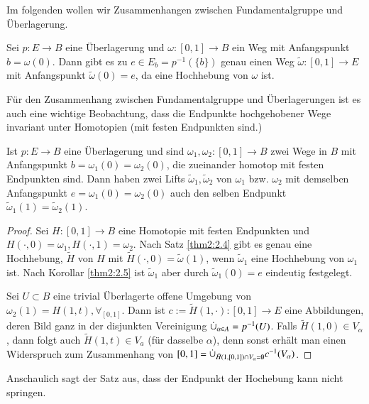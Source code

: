 \documentclass[a4paper,10pt]{scrartcl}
\begin{document}
Im folgenden wollen wir Zusammenhangen zwischen Fundamentalgruppe und Überlagerung.
\begin{kor} \label{thm2:2.5}
 Sei $p:E\to B$ eine Überlagerung und $\omega:[0,1]\to B$ ein Weg mit Anfangspunkt $b=\omega(0)$. Dann gibt es zu $e\in E_b=p^{-1}(\{b\})$ genau einen Weg $\tilde \omega: [0,1] \to E$ mit Anfangspunkt $\tilde \omega(0)=e$, da eine Hochhebung von $\omega$ ist.
\end{kor}
Für den Zusammenhang zwischen Fundamentalgruppe und Überlagerungen ist es auch eine wichtige Beobachtung, dass die Endpunkte hochgehobener Wege invariant unter Homotopien (mit festen Endpunkten sind.) 
\begin{kor}
 Ist $p: E\to B$ eine Überlagerung und sind $ \omega_1, \omega_2: [0,1]\to B$ zwei Wege in $B$ mit Anfangspunkt $b=\omega_1(0)=\omega_2(0)$, 
die zueinander homotop mit festen Endpunkten sind.  Dann haben zwei Lifts $\tilde \omega_1, \tilde \omega_2$ von $\omega_1$ bzw.  $\omega_2$ mit demselben Anfangspunkt $e=\omega_1(0)=\omega_2(0)$ auch den selben Endpunkt $\tilde \omega_1(1)=\tilde \omega_2(1)$.
\end{kor}
\begin{proof}
 Sei $H: [0,1] \to B$ eine Homotopie mit festen Endpunkten und $H(\cdot, 0)=\omega_1, H(\cdot, 1)=\omega_2 $. Nach Satz \ref{thm2:2.4} gibt es genau eine Hochhebung, $\tilde H$ von $H$ mit $\tilde H(\cdot, 0)=\tilde \omega(1)$, wenn $\tilde \omega_1$ eine Hochhebung von $\omega_1$ ist. 
Nach Korollar \ref{thm2:2.5} ist $\tilde \omega_1$ aber durch $\tilde \omega_1(0)=e$ eindeutig festgelegt.

Sei $U\subset B$ eine trivial Überlagerte offene Umgebung von $\omega_2(1)=H(1,t), \forall_[0,1]$. Dann ist $c:= \tilde H(1, \cdot): [0,1]\to E$ eine Abbildungen, deren Bild ganz in der disjunkten Vereinigung $\mathbin{\dot{\cup}}_{\alpha\in A}=p^{-1}(U)$. 
Falls $\tilde H(1,0)\in V_\alpha$, dann folgt auch $\tilde H(1,t) \in V_a$ (für dasselbe $\alpha$), denn sonst erhält man einen Widerspruch zum Zusammenhang von $[0,1]=\mathbin{\dot{\cup}}_{\tilde H(1,[0,1])\cap V_\alpha=\emptyset} c^{-1}(V_\alpha)$.
\end{proof}
Anschaulich sagt der Satz aus, dass der Endpunkt der Hochebung kann nicht springen.
\end{document}
